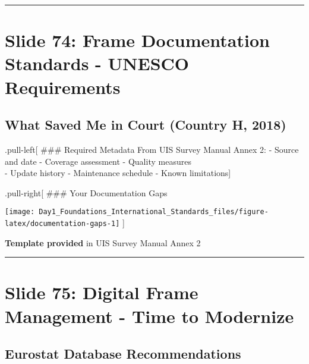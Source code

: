 \documentclass[
]{article}
\begin{document}
\begin{center}\rule{0.5\linewidth}{0.5pt}\end{center}

\section{Slide 74: Frame Documentation Standards - UNESCO
Requirements}\label{slide-74-frame-documentation-standards---unesco-requirements}

\subsection{What Saved Me in Court (Country H,
2018)}\label{what-saved-me-in-court-country-h-2018}

.pull-left{[} \#\#\# Required Metadata From UIS Survey Manual Annex 2: -
Source and date - Coverage assessment - Quality measures\\
- Update history - Maintenance schedule - Known limitations{]}

.pull-right{[} \#\#\# Your Documentation Gaps

\texttt{[image: Day1\_Foundations\_International\_Standards\_files/figure-latex/documentation-gaps-1]}
{]}

\textbf{Template provided} in UIS Survey Manual Annex 2

\begin{center}\rule{0.5\linewidth}{0.5pt}\end{center}

\section{Slide 75: Digital Frame Management - Time to
Modernize}\label{slide-75-digital-frame-management---time-to-modernize}

\subsection{Eurostat Database
Recommendations}\label{eurostat-database-recommendations}
\end{document}
